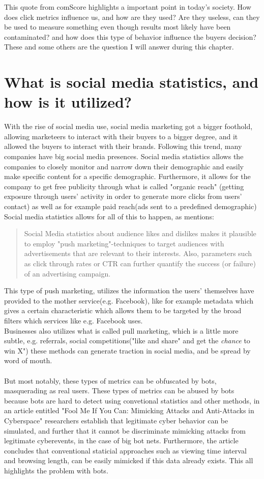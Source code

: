 This quote from comScore highlights a important point in today's society. How does click metrics influence us, and how are they used? Are they useless, can they be used to measure something even though results most likely have been contaminated? and how does this type of behavior influence the buyers decision? These and some others are the question I will answer during this chapter. 


\section{What is  social media statistics, and how is it utilized?}
With the rise of social media use, social media marketing got a bigger foothold, allowing marketeers to interact with their buyers to a bigger degree, and it allowed the buyers to interact with their brands. Following this trend, many companies have big social media presences. Social media statistics allows the companies to closely monitor and narrow down their demographic and easily make specific content for a specific demographic. Furthermore, it allows for the company to get free publicity through what is called "organic reach" (getting exposure through users' activity in order to generate more clicks from users' contact) as well as for example paid reach(ads sent to a predefined demographic)
Social media statistics allows for all of this to happen, as \cite{Singh2013} mentions:
\begin{quotation}
Social Media statistics about audience likes and dislikes makes it plausible to employ "push marketing"-techniques to target audiences with advertisements that are relevant to their interests. Also, parameters such as click through rates or CTR can further quantify the success (or failure) of an advertising campaign. 
\end{quotation}
This type of push marketing, utilizes the information the users' themselves have provided to the mother service(e.g. Facebook), like for example metadata which gives a certain characteristic which allows them to be targeted by the broad filters which services like e.g. Facebook uses. 
\\
Businesses also utilizes what is called pull marketing, which is a little more subtle, e.g. referrals, social competitions("like and share" and get the \textit{chance} to win X") these methods can generate traction in social media, and be spread by word of mouth. 
\\
\\
But most notably, these types of metrics can be obfuscated by bots, masquerading as real users. These types of metrics can be abused by bots because bots are hard to detect using convetional statistics and other methods, in an article entitled "Fool Me If You Can: Mimicking Attacks and Anti-Attacks in Cyberspace" \cite{6601602} researchers establish that legitimate cyber behavior can be simulated, and further that it cannot be discriminate mimicking attacks from legitimate cyberevents, in the case of big bot nets. Furthermore, the article concludes that conventional staticial approaches such as viewing time interval and browsing length, can be easily mimicked if this data already exists. This all highlights the problem with bots.


